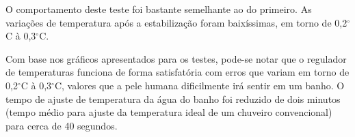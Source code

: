 \noindent O comportamento deste teste foi bastante semelhante ao do primeiro. As variações de temperatura após a estabilização foram baixíssimas, em torno de 0,2$^{\circ}$C à 0,3$^{\circ}$C.

Com base nos gráficos apresentados para os testes, pode-se notar que o regulador de temperaturas funciona de forma satisfatória com erros que variam em torno de  0,2$^{\circ}$C à 0,3$^{\circ}$C, valores que a pele humana dificilmente irá sentir em um banho. O tempo de ajuste de temperatura da água do banho foi reduzido de dois minutos (tempo médio para ajuste da temperatura ideal de um chuveiro convencional) para cerca de 40 segundos.